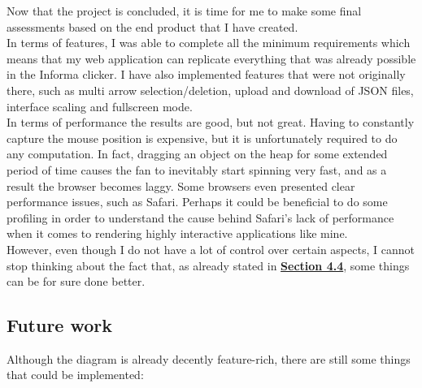 \documentclass[]{usiinfbachelorproject}
\begin{document}
Now that the project is concluded, it is time for me to make some final assessments based on the end product that I have created. \\
In terms of features, I was able to complete all the minimum requirements which means that my web application can replicate everything that was already possible in the Informa clicker. I have also implemented features that were not originally there, such as multi arrow selection/deletion, upload and download of JSON files, interface scaling and fullscreen mode.\\
In terms of performance the results are good, but not great. Having to constantly capture the mouse position is expensive, but it is unfortunately required to do any computation. In fact, dragging an object on the heap for some extended period of time causes the fan to inevitably start spinning very fast, and as a result the browser becomes laggy. Some browsers even presented clear performance issues, such as Safari. Perhaps it could be beneficial to do some profiling in order to understand the cause behind Safari's lack of performance when it comes to rendering highly interactive applications like mine. \\
However, even though I do not have a lot of control over certain aspects, I cannot stop thinking about the fact that, as already stated in \hyperref[storing states]{\textbf{Section 4.4}}, some things can be for sure done better.

\subsection{Future work} \label{future work}

Although the diagram is already decently feature-rich, there are still some things that could be implemented:
\end{document}
